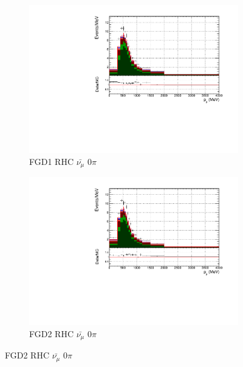 \begin{figure}[!h]
\begin{subfigure}{0.49\textwidth}
  \centering
  \includegraphics[width=\textwidth]{figs/FGD1_anti-numuCC_0pi_p}
  \caption{FGD1 RHC $\bar{\nu_{\mu}}$ 0$\pi$}
\end{subfigure}
\begin{subfigure}{0.49\textwidth}
  \centering
  \includegraphics[width=\textwidth]{figs/FGD2_anti-numuCC_0pi_p}
  \caption{FGD2 RHC $\bar{\nu_{\mu}}$ 0$\pi$}
\end{subfigure}


\end{figure}
